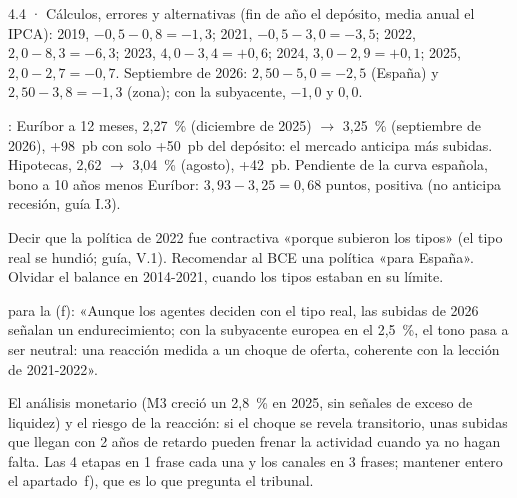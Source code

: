 \begin{complemento}{4.4 · Cálculos, errores y alternativas}
 (fin de año el depósito, media anual el IPCA): 2019, $-0{,}5-0{,}8=-1{,}3$; 2021, $-0{,}5-3{,}0=-3{,}5$; 2022, $2{,}0-8{,}3=-6{,}3$; 2023, $4{,}0-3{,}4=+0{,}6$; 2024, $3{,}0-2{,}9=+0{,}1$; 2025, $2{,}0-2{,}7=-0{,}7$. Septiembre de 2026: $2{,}50-5{,}0=-2{,}5$ (España) y $2{,}50-3{,}8=-1{,}3$ (zona); con la subyacente, $-1{,}0$ y $0{,}0$.

: Euríbor a 12 meses, 2,27~\% (diciembre de 2025) $\to$ 3,25~\% (septiembre de 2026), +98~pb con solo +50~pb del depósito: el mercado anticipa más subidas. Hipotecas, 2,62 $\to$ 3,04~\% (agosto), +42~pb. Pendiente de la curva española, bono a 10 años menos Euríbor: $3{,}93-3{,}25=0{,}68$ puntos, positiva (no anticipa recesión, guía I.3).

 Decir que la política de 2022 fue contractiva «porque subieron los tipos» (el tipo real se hundió; guía, V.1). Recomendar al BCE una política «para España». Olvidar el balance en 2014-2021, cuando los tipos estaban en su límite.

 para la (f): «Aunque los agentes deciden con el tipo real, las subidas de 2026 señalan un endurecimiento; con la subyacente europea en el 2,5~\%, el tono pasa a ser neutral: una reacción medida a un choque de oferta, coherente con la lección de 2021-2022».

 El análisis monetario (M3 creció un 2,8~\% en 2025, sin señales de exceso de liquidez) y el riesgo de la reacción: si el choque se revela transitorio, unas subidas que llegan con 2 años de retardo pueden frenar la actividad cuando ya no hagan falta.  Las 4 etapas en 1 frase cada una y los canales en 3 frases; mantener entero el apartado~f), que es lo que pregunta el tribunal.
\end{complemento}

